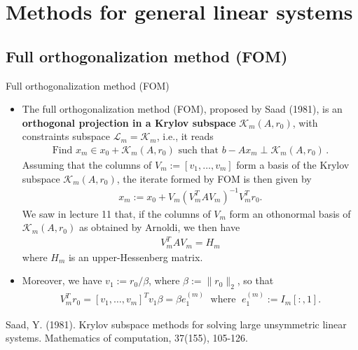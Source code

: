 \documentclass[t,usepdftitle=false]{beamer}
\begin{document}
\section{Methods for general linear systems}

\subsection{Full orthogonalization method (FOM)}
\begin{frame}{Full orthogonalization method (FOM)}
\begin{itemize}
\item The full orthogonalization method (FOM), proposed by Saad (1981), is an \textbf{orthogonal projection in a Krylov subspace} $\mathcal{K}_m(A,r_0)$, with constraints subspace $\mathcal{L}_m=\mathcal{K}_m$, i.e., it reads
\begin{align*}
\boxed{
\text{Find }x_m\in x_0+\mathcal{K}_m(A,r_0)\text{ such that }b-Ax_m\perp\mathcal{K}_m(A,r_0)}
\,.
\end{align*}
Assuming that the columns of $V_m:=[v_1,\dots,v_m]$ form a basis of the Krylov subspace $\mathcal{K}_m(A,r_0)$, the iterate formed by FOM is then given by
\begin{align*}
x_m:=x_0+V_m(V_m^TAV_m)^{-1}V_m^Tr_0.
\end{align*}
We saw in lecture 11 that, if the columns of $V_m$ form an othonormal basis of $\mathcal{K}_m(A,r_0)$ as obtained by Arnoldi, we then have
\begin{align*}
V_m^TAV_m=H_m
\end{align*}
where $H_m$ is an upper-Hessenberg matrix.
\item[] Moreover, we have $v_1:=r_0/\beta$, where $\beta:=\|r_0\|_2$, so that 
\begin{align*}
V_m^Tr_0=[v_1,\dots,v_m]^Tv_1\beta=\beta e_1^{(m)}
\;\text{ where }\;
e_1^{(m)}:=I_m[:,1].
\end{align*}
\end{itemize}
\tiny{Saad, Y. (1981). Krylov subspace methods for solving large unsymmetric linear systems. Mathematics of computation, 37(155), 105-126.}
\end{frame}
\end{document}
